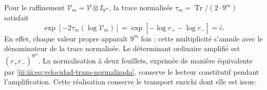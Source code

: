 Pour le raffinement $\mathcal V_m=\mathcal V\otimes I_{9^m}$, la trace normalisée $\tau_m=\operatorname{Tr}/(2\cdot9^m)$ satisfait
\begin{equation}
 \exp[-2\tau_m(\log\mathcal V_m)]
 =\exp[-\log r_+-\log r_-]=\widehat c.
 \label{iii:iii:eq:velocidad-traza-normalizada}
\end{equation}
En effet, chaque valeur propre apparaît $9^m$ fois ; cette multiplicité
s’annule avec le dénominateur de la trace normalisée. Le déterminant
ordinaire amplifié est $(r_+r_-)^{9^m}$. La normalisation à deux feuillets,
exprimée de manière équivalente par \eqref{iii:iii:eq:velocidad-traza-normalizada},
conserve le lecteur constitutif pendant l’amplification. Cette
réalisation conserve le transport enrichi dont elle est issue.
